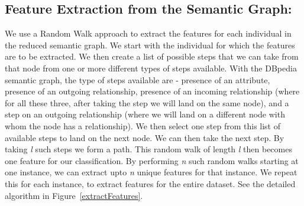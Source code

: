 \documentclass[runningheads,a4paper]{llncs}
\begin{document}
\subsection{Feature Extraction from the Semantic Graph:}
\label{featureExtraction}
We use a Random Walk approach to extract the features for each individual \cite{tsuda2010graph} in the reduced semantic graph. 
We start with the individual for which the features are to be extracted. We then create a 
list of possible steps that we can take from that node from one or more different types of steps available. 
With the DBpedia semantic graph, the type of steps available are - 
presence of an attribute, presence of an outgoing relationship, presence of an incoming relationship (where for all these three, after taking the step we will land on the same node), and a step on an outgoing relationship (where we will land on a different node with whom the node has a relationship). 
We then select one step from this list of available steps to land on the next node. We can then take the next step. 
By taking \textit{l} such steps
we form a path. 
This random walk of length \textit{l} then becomes one feature for our classification. By performing \textit{n} such random walks starting at one instance, we can extract upto \textit{n} unique features for that instance. We repeat this for each instance, to extract features for the entire dataset.
See the detailed algorithm in Figure~\ref{extractFeatures}. 
\end{document}

